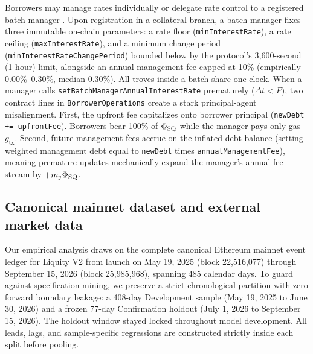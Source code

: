 Borrowers may manage rates individually or delegate rate control to a registered batch manager \citep{liquity2024arm}. Upon registration in a collateral branch, a batch manager fixes three immutable on-chain parameters: a rate floor (\texttt{minInterestRate}), a rate ceiling (\texttt{maxInterestRate}), and a minimum change period (\texttt{minInterestRateChangePeriod}) bounded below by the protocol's 3,600-second (1-hour) limit, alongside an annual management fee capped at 10\% (empirically 0.00\%--0.30\%, median 0.30\%). All troves inside a batch share one clock. When a manager calls \texttt{setBatchManagerAnnualInterestRate} prematurely ($\Delta t < P$), two contract lines in \texttt{BorrowerOperations} create a stark principal-agent misalignment. First, the upfront fee capitalizes onto borrower principal (\texttt{newDebt += upfrontFee}). Borrowers bear 100\% of $\Phi_{\text{SQ}}$ while the manager pays only gas $g_{\text{tx}}$. Second, future management fees accrue on the inflated debt balance (setting weighted management debt equal to \texttt{newDebt} times \texttt{annualManagementFee}), meaning premature updates mechanically expand the manager's annual fee stream by $+m_j \Phi_{\text{SQ}}$.

\subsection{Canonical mainnet dataset and external market data}\label{subsec:data}

Our empirical analysis draws on the complete canonical Ethereum mainnet event ledger for Liquity V2 from launch on May 19, 2025 (block 22,516,077) through September 15, 2026 (block 25,985,968), spanning 485 calendar days. To guard against specification mining, we preserve a strict chronological partition with zero forward boundary leakage: a 408-day Development sample (May 19, 2025 to June 30, 2026) and a frozen 77-day Confirmation holdout (July 1, 2026 to September 15, 2026). The holdout window stayed locked throughout model development. All leads, lags, and sample-specific regressions are constructed strictly inside each split before pooling.

